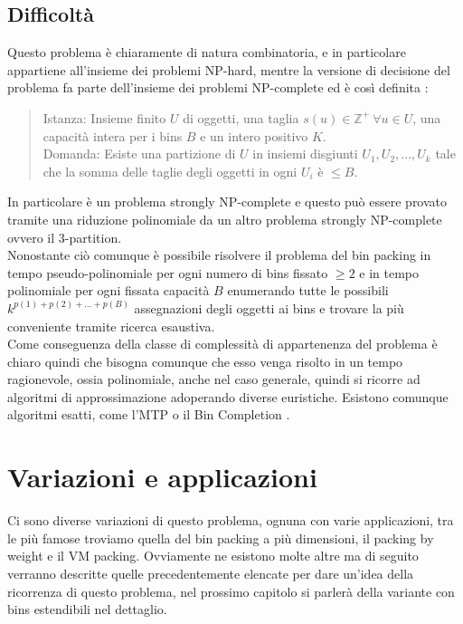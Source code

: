 \subsection{Difficoltà}
Questo problema è chiaramente di natura combinatoria, e in particolare appartiene all'insieme dei problemi NP-hard, mentre
la versione di decisione del problema fa parte dell'insieme dei problemi NP-complete ed è così definita \cite{CaI_NP}:
\begin{quote}
	Istanza: Insieme finito $ U $ di oggetti, una taglia $ s(u) \in \mathbb{Z}^+ \: \forall u \in U $, una capacità intera
	per i bins $ B $ e un intero positivo $ K $. \\
	Domanda: Esiste una partizione di $ U $ in insiemi disgiunti $ U_1, U_2, ..., U_k $ tale che la somma delle taglie degli
	oggetti in ogni $ U_i $ è $ \leq B $.
\end{quote}
In particolare è un problema strongly NP-complete e questo può essere provato tramite una riduzione polinomiale da un altro
problema strongly NP-complete ovvero il 3-partition. \\
Nonostante ciò comunque è possibile risolvere il problema del bin packing in tempo pseudo-polinomiale per ogni numero di
bins fissato $ \geq 2 $ \cite{BinPackingFixedSize} e in tempo polinomiale per
ogni fissata capacità $ B $ enumerando tutte le possibili $ k^{p(1) + p(2) + ... + p(B)} $ assegnazioni degli oggetti ai
bins e trovare la più conveniente tramite ricerca esaustiva. \\
Come conseguenza della classe di complessità di appartenenza del problema è chiaro quindi che bisogna comunque che esso
venga risolto in un tempo ragionevole, ossia polinomiale, anche nel caso generale, quindi si ricorre ad algoritmi
di approssimazione adoperando diverse euristiche.
Esistono comunque algoritmi esatti, come l'MTP \cite{MTP} o il Bin Completion \cite{BinCompletion}.


\section{Variazioni e applicazioni}
Ci sono diverse variazioni di questo problema, ognuna con varie applicazioni, tra le più famose troviamo quella
del bin packing a più dimensioni, il packing by weight e il VM packing. Ovviamente ne esistono molte altre ma di seguito 
verranno descritte quelle precedentemente elencate per dare un'idea della ricorrenza di questo problema, nel prossimo 
capitolo si parlerà della variante con bins estendibili nel dettaglio.

